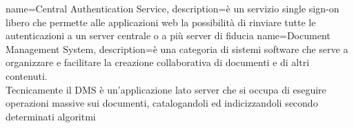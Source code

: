 


{
  name=Central Authentication Service,
  description={è un servizio single sign-on libero che permette alle applicazioni web la possibilità di rinviare tutte le autenticazioni a un server centrale o a più server di fiducia}
}
{
  name=Document Management System,
  description={è una categoria di sistemi software che serve a organizzare e facilitare la creazione collaborativa di documenti e di altri contenuti.\\
Tecnicamente il DMS è un'applicazione lato server che si occupa di eseguire operazioni massive sui documenti, catalogandoli ed indicizzandoli secondo determinati algoritmi}
}